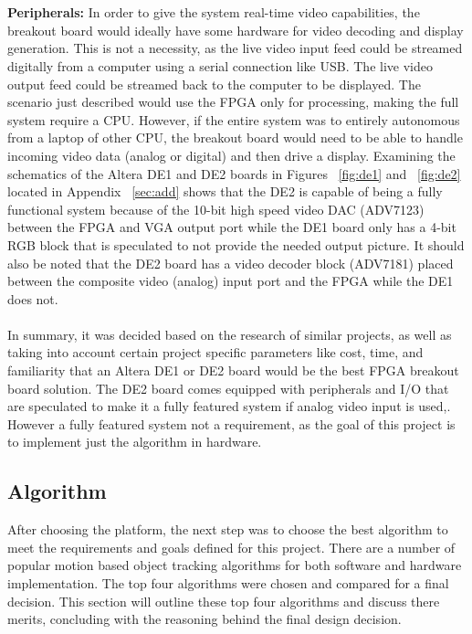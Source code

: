 \documentclass[11pt]{article} %
\begin{document}
\\\\
\textbf{Peripherals:} In order to give the system real-time video capabilities, the breakout board would ideally have some hardware for video decoding and display generation. This is not a necessity, as the live video input feed could be streamed digitally from a computer using  a serial connection like USB. The live video output feed could be streamed back to the computer to be displayed. The scenario just described would use the FPGA only for processing, making the full system require a CPU. However, if the entire system was to entirely autonomous from a laptop of other CPU, the breakout board would need to be able to handle incoming video data (analog or digital) and then drive a display. Examining the schematics of the Altera DE1 and DE2 boards in Figures ~\ref{fig:de1} and ~\ref{fig:de2} located in Appendix ~\ref{sec:add} shows that the DE2 is capable of being a fully functional system because of the 10-bit high speed video DAC (ADV7123) between the FPGA and VGA output port while the DE1 board only has a 4-bit RGB block that is speculated to not provide the needed output picture. It should also be noted that the DE2 board has a video decoder block (ADV7181) placed between the composite video (analog) input port and the FPGA while the DE1 does not.\\\\ 
In summary, it was decided based on the research of similar projects, as well as taking into account certain project specific parameters like cost, time, and familiarity that an Altera DE1 or DE2 board would be the best FPGA breakout board solution. The DE2 board comes equipped with peripherals and I/O that are speculated to make it a fully featured system if analog video input is used,. However a fully featured system not a requirement, as the goal of this project is to implement just the algorithm in hardware.
\subsection{Algorithm}
\label{sec:algorithm}
After choosing the platform, the next step was to choose the best algorithm to meet the requirements and goals defined for this project. There are a number of popular motion based object tracking algorithms for both software and hardware implementation. The top four algorithms were chosen and compared for a final decision. This section will outline these top four algorithms and discuss there merits, concluding with the reasoning behind the final design decision.
\end{document}
